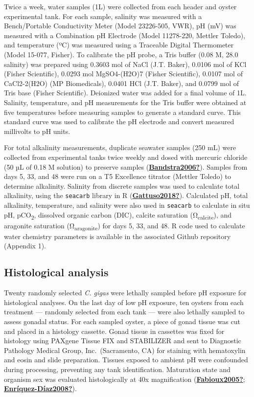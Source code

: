 \documentclass [11pt, proquest] {uwthesis}[2015/03/03]
\begin{document}
Twice a week, water samples (1L) were collected from each header and oyster experimental tank. For each sample, salinity was measured with a Bench/Portable Conductivity Meter (Model 23226-505, VWR), pH (mV) was measured with a Combination pH Electrode (Model 11278-220, Mettler Toledo), and temperature (ºC) was measured using a Traceable Digital Thermometer (Model 15-077, Fisher). To calibrate the pH probe, a Tris buffer (0.08 M, 28.0 salinity) was prepared using 0.3603 mol of NaCl (J.T. Baker), 0.0106 mol of KCl (Fisher Scientific), 0.0293 mol MgSO4-(H2O)7 (Fisher Scientific), 0.0107 mol of CaCl2-2(H2O) (MP Biomedicals), 0.0401 HCl (J.T. Baker), and 0.0799 mol of Tris base (Fisher Scientific). Deionized water was added for a final volume of 1L. Salinity, temperature, and pH measurements for the Tris buffer were obtained at five temperatures before measuring samples to generate a standard curve. This standard curve was used to calibrate the pH electrode and convert measured millivolts to pH units.

For total alkalinity measurements, duplicate seawater samples (250 mL) were collected from experimental tanks twice weekly and dosed with mercuric chloride (50 µL of 0.18 M solution) to preserve samples (\protect\hyperlink{ref-Bandstra2006}{\textbf{Bandstra2006?}}). Samples from days 5, 33, and 48 were run on a T5 Excellence titrator (Mettler Toledo) to determine alkalinity. Salinity from discrete samples was used to calculate total alkalinity, using the \texttt{seacarb} library in R (\protect\hyperlink{ref-Gattuso2018}{\textbf{Gattuso2018?}}). Calculated pH, total alkalinity, temperature, and salinity were also used in \texttt{seacarb} to calculate in situ pH, pCO\textsubscript{2}, dissolved organic carbon (DIC), calcite saturation (Ω\textsubscript{calcite}), and aragonite saturation (Ω\textsubscript{aragonite}) for days 5, 33, and 48. R code used to calculate water chemistry parameters is available in the associated Github repository (Appendix 1).

\hypertarget{histological-analysis}{%
\subsection{Histological analysis}\label{histological-analysis}}

Twenty randomly selected \emph{C. gigas} were lethally sampled before pH exposure for histological analyses. On the last day of low pH exposure, ten oysters from each treatment --- randomly selected from each tank --- were also lethally sampled to assess gonadal status. For each sampled oyster, a piece of gonad tissue was cut and placed in a histology cassette. Gonad tissue in cassettes was fixed for histology using PAXgene Tissue FIX and STABILIZER and sent to Diagnostic Pathology Medical Group, Inc.~(Sacramento, CA) for staining with hematoxylin and eosin and slide preparation. Tissues exposed to ambient pH were confounded during processing, preventing any tank identification. Maturation state and organism sex was evaluated histologically at 40x magnification (\protect\hyperlink{ref-Fabioux2005}{\textbf{Fabioux2005?}}; \protect\hyperlink{ref-Enruxedquez-Duxedaz2008}{\textbf{Enríquez-Díaz2008?}}).
\end{document}
